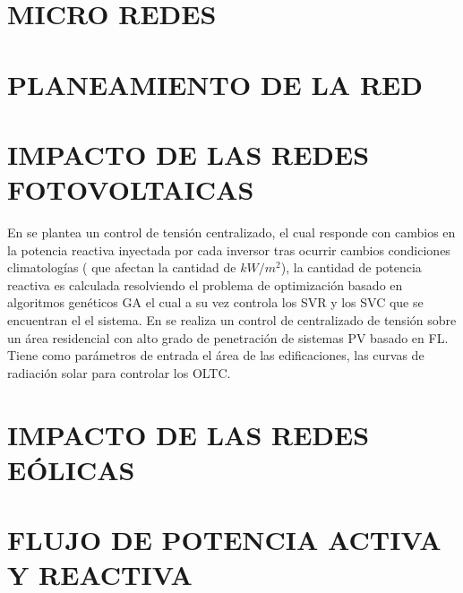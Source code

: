 \documentclass[12pt, letterpaper]{report}
\begin{document}
\section{MICRO REDES}
\section{PLANEAMIENTO DE LA RED}

\section{IMPACTO DE LAS REDES FOTOVOLTAICAS}

En \cite{Oshiro2011a} se plantea un control de tensión centralizado,  el cual responde con  cambios en la potencia reactiva inyectada por cada inversor tras  ocurrir cambios condiciones climatologías ( que afectan la cantidad de $kW/m^{2}$), la cantidad de potencia reactiva es calculada resolviendo el problema de optimización  basado en algoritmos genéticos \ac{GA} el cual a su vez controla los \ac{SVR}  y los \ac{SVC} que se encuentran el el sistema. 
En \cite{Shalwala2011a} se realiza un control de centralizado  de tensión sobre un área residencial con alto grado de penetración de sistemas \ac{PV} basado en \ac{FL}. Tiene como parámetros  de entrada el área de las edificaciones, las curvas de radiación solar para controlar los \ac{OLTC}.  

\section{IMPACTO DE LAS REDES EÓLICAS}


\section{FLUJO DE POTENCIA ACTIVA Y REACTIVA}

\end{document}

